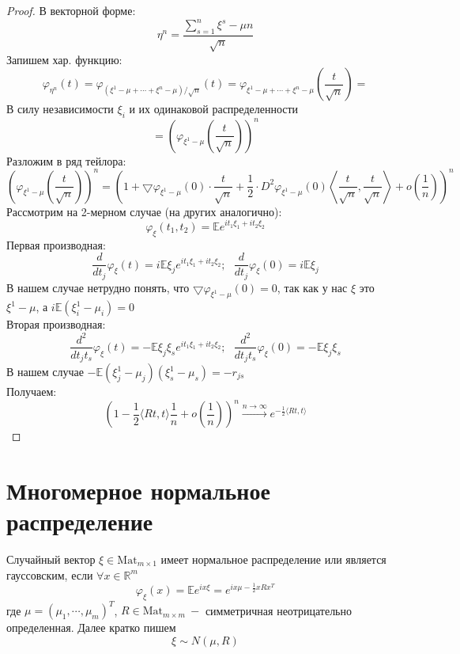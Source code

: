 \begin{proof}
В векторной форме:
\[  
    \eta^{n} = \dfrac{\sum\limits_{s=1}^{n}\xi^{s} - \mu n}{\sqrt{n}}
\]
Запишем хар. функцию:
\[
    \varphi_{\eta^{n}}(t) = \varphi_{(\xi^{1} - \mu + \cdots + \xi^{n} - \mu)/\sqrt{n}}(t) = \varphi_{\xi^{1} - \mu + \cdots + \xi^{n} - \mu}\left(\frac{t}{\sqrt{n}}\right) = 
    \]
    В силу независимости $\xi_i$ и их одинаковой распределенности
    \[
        = \left(\varphi_{\xi^{1} - \mu}\left(\frac{t}{\sqrt{n}}\right)\right)^n
    \]
Разложим в ряд тейлора:
\[
    \left(\varphi_{\xi^{1} - \mu}\left(\frac{t}{\sqrt{n}}\right)\right)^n = \left(1 + \bigtriangledown \varphi_{\xi^{1} - \mu}(0) \cdot \frac{t}{\sqrt{n}} + \frac{1}{2}\cdot D^2\varphi_{\xi^{1} - \mu}(0) \left<\frac{t}{\sqrt{n}}, \frac{t}{\sqrt{n}}\right>  + o\left(\frac1n\right)\right)^n
\]
Рассмотрим на 2-мерном случае (на других аналогично):
\[
    \varphi_{\xi}(t_1, t_2) = \mathbb{E}e^{it_1\xi_1 + it_2 \xi_2}
\]
Первая производная:
\[
    \frac{d}{d t_{j}} \varphi_{\xi}(t) = i\mathbb{E}\xi_{j} e^{it_1\xi_1 + it_2 \xi_2}; \text{ } \frac{d}{d t_{j}} \varphi_{\xi}(0) = i\mathbb{E}\xi_{j}
\]
В нашем случае нетрудно понять, что $\bigtriangledown \varphi_{\xi^{1} - \mu}(0) = 0$, так как у нас $\xi$ это $\xi^{1} - \mu$, а $i\mathbb{E}(\xi_{i}^{1} - \mu_{i}) = 0$\\
Вторая производная:
\[
    \dfrac{d^2}{d t_{j} t_{s}} \varphi_{\xi}(t) = -\mathbb{E}\xi_{j} \xi_{s} e^{it_1\xi_1 + it_2 \xi_2}; \text{ } \frac{d^2}{d t_{j} t_{s}} \varphi_{\xi}(0) = -\mathbb{E}\xi_{j}\xi_{s}
\]
В нашем случае $-\mathbb{E}(\xi_{j}^{1} - \mu_{j})(\xi_{s}^{1} - \mu_{s}) = -r_{js}$\\
Получаем:
\[
    \left(1 - \dfrac{1}{2}\langle Rt, t \rangle \frac{1}{n} + o\left(\frac1n\right)\right)^n \xrightarrow{n \to \infty} e^{-\frac{1}{2}\langle Rt, t \rangle}
\]
\end{proof}

\clearpage

\section{Многомерное нормальное распределение}  

\begin{definition} Случайный вектор $\xi \in \text{Mat}_{m \times 1}$ имеет $\textit{нормальное распределение}$ или является $\textit{гауссовским}$, если $\forall x \in \mathbb{R} ^ m$
\[
    \varphi_{\xi}\left(x\right) = \mathbb{E}  e ^ {i  x \xi} = e ^ {i x\mu - \frac12 x R x ^ T}
\]
где $\mu = \left(\mu_1, \cdots , \mu_m\right)^T$, $R \in \text{Mat}_{m \times m}\ - $ симметричная неотрицательно определенная. Далее кратко пишем
\[
    \xi \sim N\left(\mu, R\right)
\]
\end{definition}

